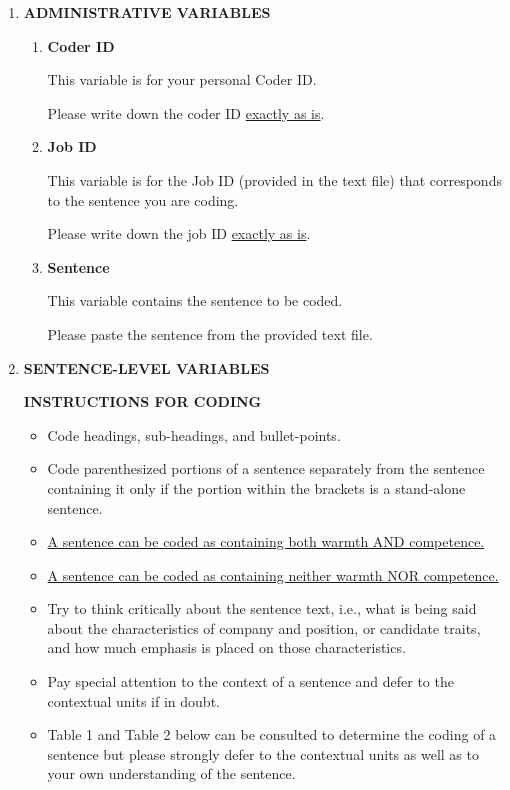 \documentclass[jou]{apa7}
\begin{document}
\begin{enumerate}[label=\textbf{C\arabic*.}, wide=0pt, itemindent=0.25\textwidth]
    \item \textbf{ADMINISTRATIVE VARIABLES}
    \label{administrative_variables}
    \begin{enumerate}[label=\textbf{C\arabic{enumi}.\arabic*.}, wide=0pt]
        \item \noindent\textbf{Coder ID}

        This variable is for your personal Coder ID.

        {\small Please write down the coder ID \uline{exactly as is}.}

        \item \noindent\textbf{Job ID}

        This variable is for the Job ID (provided in the text file) that corresponds to the sentence you are coding.

        {\small Please write down the job ID \uline{exactly as is}.}

        \item \noindent\textbf{Sentence}

        This variable contains the sentence to be coded.

        {\small Please paste the sentence from the provided text file.}
        \end{enumerate}

    \item \textbf{SENTENCE-LEVEL VARIABLES}
    \label{sentence_level_variables}

    \textbf{INSTRUCTIONS FOR CODING}
    \label{instructions_for_coding}
    \begin{itemize}
        \item Code headings, sub-headings, and bullet-points.
        \item Code parenthesized portions of a sentence separately from the sentence containing it only if the portion within the brackets is a stand-alone sentence.
        \item \uline{A sentence can be coded as containing both warmth AND competence.}
        \item \uline{A sentence can be coded as containing neither warmth NOR competence.}
        \item Try to think critically about the sentence text, i.e., what is being said about the characteristics of company and position, or candidate traits, and how much emphasis is placed on those characteristics.
        \item Pay special attention to the context of a sentence and defer to the contextual units if in doubt.
        \item Table 1 and Table 2 below can be consulted to determine the coding of a sentence but please strongly defer to the contextual units as well as to your own understanding of the sentence.
        \end{itemize}


\end{enumerate}
\end{document}
